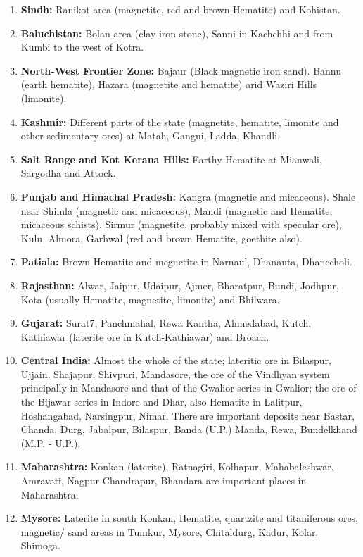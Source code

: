 \begin{enumerate}
\renewcommand{\theenumi}{\arabic{enumi}.}
\renewcommand{\labelenumi}{\bf \theenumi}
\item {\bf Sindh:} Ranikot area (magnetite, red and brown Hematite) and Kohistan.
\item {\bf Baluchistan:} Bolan area (clay iron stone), Sanni in Kachchhi and from Kumbi to the west of Kotra.
\item {\bf North-West Frontier Zone:} Bajaur (Black magnetic iron sand). Bannu (earth hematite), Hazara (magnetite and hematite) arid Waziri Hills (limonite).
\item {\bf Kashmir:} Different parts of the state (magnetite, hematite, limonite and other sedimentary ores) at Matah, Gangni, Ladda, Khandli. 
\item {\bf Salt Range and Kot Kerana Hills:} Earthy Hematite at Mianwali, Sargodha and Attock.
\item {\bf Punjab and Himachal Pradesh:} Kangra (magnetic and micaceous). Shale near  Shimla (magnetic and micaceous), Mandi (magnetic and Hematite, micaceous schists), Sirmur (magnetite, probably mixed with specular ore), Kulu, Almora, Garhwal (red and brown Hematite, goethite also).
\item {\bf Patiala:} Brown Hematite and megnetite in Narnaul, Dhanauta, Dhanccholi.
\item {\bf Rajasthan:} Alwar, Jaipur, Udaipur, Ajmer, Bharatpur, Bundi, Jodhpur, Kota (usually Hematite, magnetite, limonite) and Bhilwara.
\item {\bf Gujarat:} Surat7, Panchmahal, Rewa Kantha, Ahmedabad, Kutch, Kathiawar (laterite ore in Kutch-Kathiawar) and Broach.
\item {\bf  Central India:} Almost the whole of the state; lateritic ore in Bilaspur, Ujjain, Shajapur, Shivpuri, Mandasore, the ore of the Vindhyan system principally in Mandasore and that of the Gwalior series in Gwalior; the ore of the Bijawar series in Indore and Dhar, also Hematite in Lalitpur, Hoshangabad, Narsingpur, Nimar. There are important deposits near Bastar, Chanda, Durg, Jabalpur, Bilaspur, Banda (U.P.) Manda, Rewa, Bundelkhand (M.P. - U.P.).
\item {\bf Maharashtra:} Konkan (laterite), Ratnagiri, Kolhapur, Mahabaleshwar, Amravati, Nagpur Chandrapur, Bhandara are important places in Maharashtra.
\item {\bf Mysore:} Laterite in south Konkan, Hematite, quartzite and titaniferous ores, mag­netic/ sand areas in Tumkur, Mysore, Chitaldurg, Kadur, Kolar, Shimoga.

\end{enumerate}
